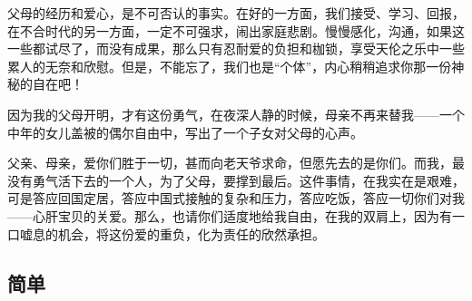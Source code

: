 \par 父母的经历和爱心，是不可否认的事实。在好的一方面，我们接受、学习、回报，在不合时代的另一方面，一定不可强求，闹出家庭悲剧。慢慢感化，沟通，如果这一些都试尽了，而没有成果，那么只有忍耐爱的负担和枷锁，享受天伦之乐中一些累人的无奈和欣慰。但是，不能忘了，我们也是“个体”，内心稍稍追求你那一份神秘的自在吧！
\par 因为我的父母开明，才有这份勇气，在夜深人静的时候，母亲不再来替我——一个中年的女儿盖被的偶尔自由中，写出了一个子女对父母的心声。
\par 父亲、母亲，爱你们胜于一切，甚而向老天爷求命，但愿先去的是你们。而我，最没有勇气活下去的一个人，为了父母，要撑到最后。这件事情，在我实在是艰难，可是答应回国定居，答应中国式接触的复杂和压力，答应吃饭，答应一切你们对我——心肝宝贝的关爱。那么，也请你们适度地给我自由，在我的双肩上，因为有一口嘘息的机会，将这份爱的重负，化为责任的欣然承担。



\subsection{简单}

